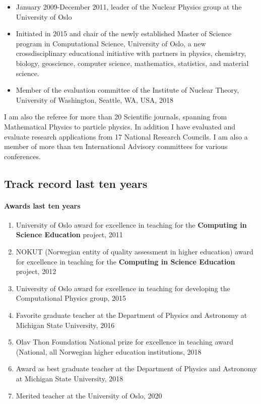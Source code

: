 \documentclass[11pt]{revtex4-1}
\begin{document}
\begin{itemize}
\item January 2009-December 2011, leader of the Nuclear Physics group at the University of Oslo

\item Initiated in 2015 and chair of  the newly established Master of Science program in Computational Science, University of Oslo, a new crossdisciplinary
educational initiative with partners in physics, chemistry, biology, geoscience,
computer science, mathematics, statistics, and material science.

\item Member of the evaluation committee of the Institute of Nuclear Theory, University of Washington, Seattle, WA, USA, 2018

\end{itemize}

I am also the referee for more than 20 Scientific journals, spanning from Mathematical Physics to particle physics. In addition I have evaluated and evaluate research applications from 17 National Research Councils. I am also a member of more than ten International Advisory committees for various conferences.


\subsection*{Track record last ten years}

\paragraph*{Awards last ten years}

\begin{enumerate}
\item University of Oslo award for excellence in teaching for the \textbf{Computing in Science Education} project, 2011

\item NOKUT (Norwegian entity of quality assessment in higher education) award for excellence in teaching for the \textbf{Computing in Science Education} project, 2012

\item University of Oslo award for excellence in teaching for developing the Computational Physics group, 2015

\item Favorite graduate teacher at the Department of Physics and Astronomy at Michigan State University, 2016 

\item Olav Thon Foundation National prize for excellence in teaching award (National, all Norwegian higher education institutions, 2018

\item Award as best graduate teacher at the Department of Physics and Astronomy at Michigan State University, 2018

\item Merited teacher at the University of Oslo, 2020

\end{enumerate}
\end{document}
